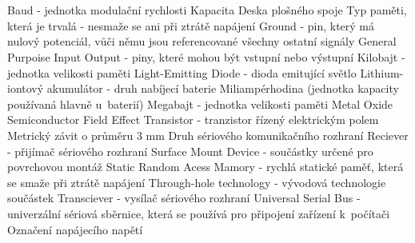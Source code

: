 \cleardoublepage
\chapter*{\listofabbrevname}
{}

\begin{acronym}[KolikMista]
		{Baud - jednotka modulační rychlosti}
		{Kapacita}
		{Deska plošného spoje}
		{Typ paměti, která je trvalá - nesmaže se ani při ztrátě napájení}
		{Ground - pin, který má nulový potenciál, vůči němu jsou referencované všechny ostatní signály}
		{General Purpoise Input Output - piny, které mohou být vstupní nebo výstupní}
		{Kilobajt - jednotka velikosti paměti}
		{Light-Emitting Diode - dioda emitující světlo}
		{Lithium-iontový akumulátor - druh nabíjecí baterie}
		{Miliampérhodina (jednotka kapacity používaná hlavně u~baterií)}
		{Megabajt - jednotka velikosti paměti}
		{Metal Oxide Semiconductor Field Effect Transistor - tranzistor řízený elektrickým polem}	
		{Metrický závit o průměru 3 mm}	
		{Druh sériového komunikačního rozhraní} 
		{Reciever - přijímač sériového rozhraní}
		{Surface Mount Device - součástky určené pro povrchovou montáž} 
		{Static Random Acess Mamory - rychlá statické paměť, která se smaže při ztrátě napájení}	
		{Through-hole technology - vývodová technologie součástek}
		{Transciever - vysílač sériového rozhraní} 
		{Universal Serial Bus - univerzální sériová sběrnice, která se používá pro připojení zařízení k~počítači}
		{Označení napájecího napětí}
		
\end{acronym}
